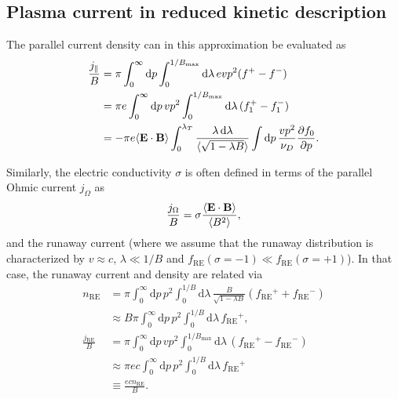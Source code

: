 \documentclass[11pt,a4paper]{article}
\newcommand{\rd}{\ensuremath{\mathrm{d}}}
\newcommand{\sub}[1]{\ensuremath{_{\text{#1}}}}
\renewcommand{\b}[1]{\ensuremath{ {\bf #1 } }}
\begin{document}
\subsection{Plasma current in reduced kinetic description}
The parallel current density can in this approximation be evaluated as
\begin{align}
\frac{j_\parallel}{B} &= \pi\int_0^\infty \rd p \int_0^{1/B\sub{max}}\rd\lambda\, evp^2(f^+-f^-) \nonumber \\
&=\pi e\int_0^\infty \rd p\,vp^2 \int_0^{1/B\sub{max}}\rd\lambda\, (f_1^+-f_1^-) \nonumber \\
&= -\pi  e\langle \b{E}\cdot\b{B}\rangle \int_0^{\lambda_T}\frac{\lambda\,\rd \lambda}{\langle\sqrt{1-\lambda B}\rangle}\int \rd p \, \frac{vp^2}{\nu_D}\frac{\partial f_0}{\partial p}.
\end{align}

Similarly, the electric conductivity $\sigma$ is often defined in terms of the parallel Ohmic current $j_\Omega$ as
\begin{align}
\frac{j_\Omega}{B} = \sigma \frac{\langle \b{E}\cdot\b{B} \rangle}{\langle B^2\rangle},
\end{align}
and the runaway current (where we assume that the runaway distribution is characterized by $v\approx c$, $\lambda \ll 1/B$ and $f\sub{RE}(\sigma=-1) \ll f\sub{RE}(\sigma=+1)$). In that case, the runaway current and density are related via
\begin{align}
n\sub{RE} &= \pi\int_0^\infty \rd p \,p^2\int_0^{1/B}\rd \lambda \,\frac{B}{\sqrt{1-\lambda B}}(f\sub{RE}^+ + f\sub{RE}^-) \nonumber \\
&\approx B \pi \int_0^\infty \rd p \,p^2\int_0^{1/B}\rd \lambda \, f\sub{RE}^+, \nonumber \\
\frac{j\sub{RE}}{B} &= \pi\int_0^\infty \rd p \,vp^2 \int_0^{1/B\sub{max}}\rd\lambda \, (f\sub{RE}^+-f\sub{RE}^-)\nonumber \\
&\approx  \pi ec\int_0^\infty \rd p \,p^2 \int_0^{1/B}\rd\lambda \, f\sub{RE}^+ \nonumber \\
&\equiv \frac{ec n\sub{RE}}{B}.
\end{align}
\end{document}
